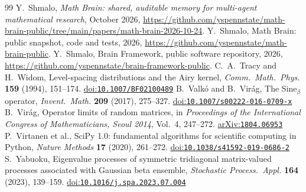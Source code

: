 \documentclass[11pt]{amsart}
\theoremstyle{remark}
\newcommand{\doi}[1]{\href{https://doi.org/#1}{doi:\nolinkurl{#1}}}
\newcommand{\arxiv}[1]{\href{https://arxiv.org/abs/#1}{arXiv:\nolinkurl{#1}}}
\begin{document}
\begin{thebibliography}{99}
 Y.~Shmalo, \emph{Math Brain: shared, auditable memory for multi-agent mathematical research},
October 2026, \url{https://github.com/yspennstate/math-brain-public/tree/main/papers/math-brain-2026-10-24}.
 Y.~Shmalo, Math Brain: public snapshot, code and tests, 2026,
\url{https://github.com/yspennstate/math-brain-public}.
 Y.~Shmalo, Brain Framework, public software repository, 2026,
\url{https://github.com/yspennstate/brain-framework-public}.
 C.~A.~Tracy and H.~Widom, Level-spacing distributions and the Airy kernel, \emph{Comm.\ Math.\ Phys.}
\textbf{159} (1994), 151--174. \doi{10.1007/BF02100489}
 B.~Valk\'o and B.~Vir\'ag, The Sine$_\beta$ operator, \emph{Invent.\ Math.} \textbf{209} (2017),
275--327. \doi{10.1007/s00222-016-0709-x}
 B.~Vir\'ag, Operator limits of random matrices, in \emph{Proceedings of the International Congress of
Mathematicians, Seoul 2014}, Vol.~4, 247--272. \arxiv{1804.06953}
 P.~Virtanen et al., SciPy 1.0: fundamental algorithms for scientific computing in Python, \emph{Nature
Methods} \textbf{17} (2020), 261--272. \doi{10.1038/s41592-019-0686-2}
 S.~Yabuoku, Eigenvalue processes of symmetric tridiagonal matrix-valued processes associated with
Gaussian beta ensemble, \emph{Stochastic Process.\ Appl.} \textbf{164} (2023), 139--159. \doi{10.1016/j.spa.2023.07.004}
\end{thebibliography}
\end{document}
